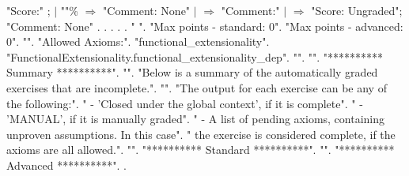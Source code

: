 \documentclass[12pt]{report}
\begin{document}
\begin{coqdoccode}
 "Score:"  ;\coqdoceol
\coqdocindent{4.00em}
     \coqdoceol
\coqdocindent{5.00em}
\ensuremath{|} ""\% \ensuremath{\Rightarrow}  "Comment: None"\coqdoceol
\coqdocindent{5.00em}
\ensuremath{|} \coqdocvar{\_} \ensuremath{\Rightarrow}  "Comment:" \coqdoceol
\coqdocindent{4.00em}
\coqdoceol
\coqdocindent{2.00em}
\ensuremath{|}  \ensuremath{\Rightarrow}\coqdoceol
\coqdocindent{4.00em}
 "Score: Ungraded";\coqdoceol
\coqdocindent{4.00em}
 "Comment: None"\coqdoceol
\coqdocindent{2.00em}
.\coqdoceol
\coqdocemptyline
\coqdocnoindent
{} .\coqdoceol
\coqdocemptyline
\coqdocnoindent
{}    .\coqdoceol
\coqdocnoindent
{} .\coqdoceol
\coqdocemptyline
\coqdocnoindent
{} .\coqdoceol
\coqdocemptyline
\coqdocnoindent
{} " ".\coqdoceol
\coqdocemptyline
\coqdocnoindent
{} "Max points - standard: 0".\coqdoceol
\coqdocnoindent
{} "Max points - advanced: 0".\coqdoceol
\coqdocnoindent
{} "".\coqdoceol
\coqdocnoindent
{} "Allowed Axioms:".\coqdoceol
\coqdocnoindent
{} "functional\_extensionality".\coqdoceol
\coqdocnoindent
{} "FunctionalExtensionality.functional\_extensionality\_dep".\coqdoceol
\coqdocnoindent
{} "".\coqdoceol
\coqdocnoindent
{} "".\coqdoceol
\coqdocnoindent
{} "********** Summary **********".\coqdoceol
\coqdocnoindent
{} "".\coqdoceol
\coqdocnoindent
{} "Below is a summary of the automatically graded exercises that are incomplete.".\coqdoceol
\coqdocnoindent
{} "".\coqdoceol
\coqdocnoindent
{} "The output for each exercise can be any of the following:".\coqdoceol
\coqdocnoindent
{} "  - 'Closed under the global context', if it is complete".\coqdoceol
\coqdocnoindent
{} "  - 'MANUAL', if it is manually graded".\coqdoceol
\coqdocnoindent
{} "  - A list of pending axioms, containing unproven assumptions. In this case".\coqdoceol
\coqdocnoindent
{} "    the exercise is considered complete, if the axioms are all allowed.".\coqdoceol
\coqdocnoindent
{} "".\coqdoceol
\coqdocnoindent
{} "********** Standard **********".\coqdoceol
\coqdocnoindent
{} "".\coqdoceol
\coqdocnoindent
{} "********** Advanced **********".\coqdoceol
\coqdocnoindent
{}.\coqdoceol
\coqdocemptyline
\coqdocemptyline
\end{coqdoccode}
\end{document}

